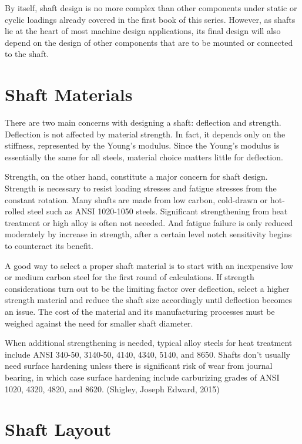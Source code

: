 \documentclass[a4paper,openany,svgnames]{kaobook}
\begin{document}
By itself, shaft design is no more complex than other components under static or cyclic loadings already covered in the first book of this series. However, as shafts lie at the heart of most machine design applications, its final design will also depend on the design of other components that are to be mounted or connected to the shaft.

\section{Shaft Materials}
\label{sec:orgfa89d0f}

There are two main concerns with designing a shaft: deflection and strength. Deflection is not affected by material strength. In fact, it depends only on the stiffness, represented by the Young's modulus. Since the Young's modulus is essentially the same for all steels, material choice matters little for deflection.

Strength, on the other hand, constitute a major concern for shaft design. Strength is necessary to resist loading stresses and fatigue stresses from the constant rotation. Many shafts are made from low carbon, cold-drawn or hot-rolled steel such as ANSI 1020-1050 steels. Significant strengthening from heat treatment or high alloy is often not neeeded. And fatigue failure is only reduced moderately by increase in strength, after a certain level notch sensitivity begins to counteract its benefit.

A good way to select a proper shaft material is to start with an inexpensive low or medium carbon steel for the first round of calculations. If strength considerations turn out to be the limiting factor over deflection, select a higher strength material and reduce the shaft size accordingly until deflection becomes an issue. The cost of the material and its manufacturing processes must be weighed against the need for smaller shaft diameter.

When additional strengthening is needed, typical alloy steels for heat treatment include ANSI 340-50, 3140-50, 4140, 4340, 5140, and 8650. Shafts don't usually need surface hardening unless there is significant risk of wear from journal bearing, in which case surface hardening include carburizing grades of ANSI 1020, 4320, 4820, and 8620. (Shigley, Joseph Edward, 2015)

\section{Shaft Layout}
\label{sec:org1cda9f4}
\end{document}
